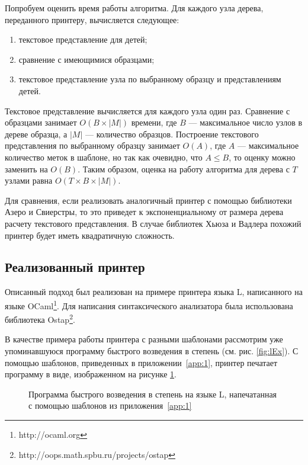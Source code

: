 
Попробуем оценить время работы алгоритма. Для каждого узла дерева, переданного принтеру, вычисляется следующее:
\begin{enumerate}
	\item текстовое представление для детей;
	\item сравнение с имеющимися образцами;
	\item текстовое представление узла по выбранному образцу и представлениям детей.
\end{enumerate}

Текстовое представление вычисляется для каждого узла один раз. Сравнение с образцами занимает $O(B \times |M|)$ времени, где $B$ --- максимальное число узлов в дереве образца, а $|M|$ --- количество образцов. Построение текстового представления по выбранному образцу занимает $O(A)$, где $A$ --- максимальное количество меток в шаблоне, но так как очевидно, что $A \leq B$, то оценку можно заменить на $O(B)$. Таким образом, оценка на работу алгоритма для дерева с $T$ узлами равна $O(T \times B \times |M|)$.

Для сравнения, если реализовать аналогичный принтер с помощью библиотеки Азеро и Свиерстры, то это приведет к экспоненциальному от размера дерева расчету текстового представления. В случае библиотек Хьюза и Вадлера похожий принтер будет иметь квадратичную сложность.

\subsection{Реализованный принтер}

Описанный подход был реализован на примере принтера языка L, написанного на языке OCaml\footnote{http://ocaml.org}. Для написания синтаксического анализатора была использована библиотека Ostap\footnote{http://oops.math.spbu.ru/projects/ostap}.

В качестве примера работы принтера с разными шаблонами рассмотрим уже упоминавшуюся программу быстрого возведения в степень (см. рис. \ref{fig:lEx}).
С помощью шаблонов, приведенных в приложении~\ref{app:1}, принтер печатает программу в виде, изображенном на рисунке \ref{fig:firstTemplatePow}.

\begin{figure}[h!]
	
	\caption{Программа быстрого возведения в степень на языке L, напечатанная с помощью шаблонов из приложения~\ref{app:1}}
	\label{fig:firstTemplatePow}
\end{figure}

